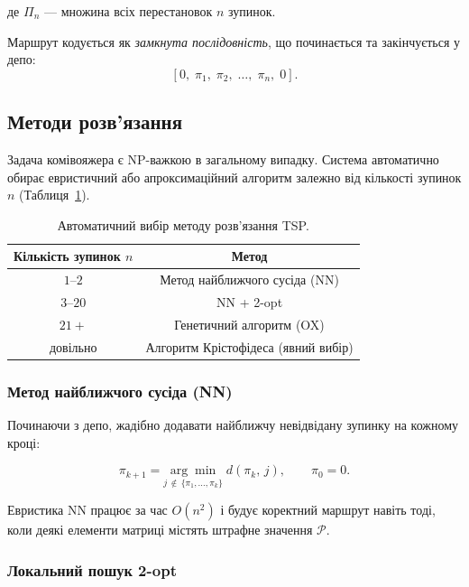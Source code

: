 \documentclass[12pt, a4paper]{article}
\theoremstyle{definition}
\begin{document}
\noindent де $\Pi_n$ --- множина всіх перестановок $n$ зупинок.

Маршрут кодується як \emph{замкнута послідовність}, що починається та
закінчується у депо:
\[
  [0,\; \pi_1,\; \pi_2,\; \ldots,\; \pi_n,\; 0].
\]

\subsection{Методи розв'язання}

Задача комівояжера є NP-важкою в загальному випадку. Система автоматично
обирає евристичний або апроксимаційний алгоритм залежно від кількості
зупинок $n$ (Таблиця~\ref{tab:tsp_methods}).

\begin{table}[h]
  \centering
  \caption{Автоматичний вибір методу розв'язання TSP.}
  \label{tab:tsp_methods}
  \begin{tabular}{cc}
    \toprule
    Кількість зупинок $n$ & Метод \\
    \midrule
    $1$--$2$  & Метод найближчого сусіда (NN) \\
    $3$--$20$ & NN + 2-opt \\
    $21+$     & Генетичний алгоритм (OX) \\
    довільно  & Алгоритм Крістофідеса (явний вибір) \\
    \bottomrule
  \end{tabular}
\end{table}

\subsubsection{Метод найближчого сусіда (NN)}

Починаючи з депо, жадібно додавати найближчу невідвідану зупинку на кожному
кроці:

\begin{equation}
  \label{eq:nn}
  \pi_{k+1} = \underset{j \,\notin\, \{\pi_1, \ldots, \pi_k\}}{\arg\min}\;
    d(\pi_k,\, j), \qquad \pi_0 = 0.
\end{equation}

Евристика NN працює за час $O(n^2)$ і будує коректний маршрут навіть тоді,
коли деякі елементи матриці містять штрафне значення $\mathcal{P}$.

\subsubsection{Локальний пошук 2-opt}
\end{document}
